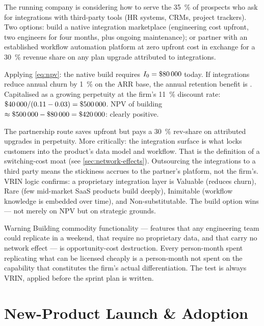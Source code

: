\begin{example}
The running company is considering how to serve the \qty{35}{\percent} of prospects who
ask for integrations with third-party tools (HR systems, CRMs, project trackers). Two
options: build a native integration marketplace (engineering cost  upfront,
two engineers for four months, plus ongoing maintenance); or partner with an established
workflow automation platform at zero upfront cost in exchange for a \qty{30}{\percent}
revenue share on any plan upgrade attributed to integrations.

Applying \cref{eq:npv}: the native build requires \(I_0 = \$\num{80000}\) today. If
integrations reduce annual churn by \qty{1}{\percent} on the  ARR base,
the annual retention benefit is . Capitalised as a growing perpetuity at the
firm's \qty{11}{\percent} discount rate: \(\$\num{40000}/(0.11 - 0.03) = \$\num{500000}\).
NPV of building \(\approx \$\num{500000} - \$\num{80000} = \$\num{420000}\): clearly positive.

The partnership route saves  upfront but pays a \qty{30}{\percent} rev-share
on attributed upgrades in perpetuity. More critically: the integration surface is what
locks customers into the product's data model and workflow. That is the definition of a
switching-cost moat (see \cref{sec:network-effects}). Outsourcing the integrations to a
third party means the stickiness accrues to the partner's platform, not the firm's.
VRIN logic confirms: a proprietary integration layer is Valuable (reduces churn),
Rare (few mid-market SaaS products build deeply), Inimitable (workflow knowledge is
embedded over time), and Non-substitutable. The build option wins --- not merely on NPV
but on strategic grounds.
\end{example}

\begin{admonition}{Warning}
Building commodity functionality --- features that any engineering team could replicate
in a weekend, that require no proprietary data, and that carry no network effect --- is
opportunity-cost destruction. Every person-month spent replicating what can be licensed
cheaply is a person-month not spent on the capability that constitutes the firm's
actual differentiation. The test is always VRIN, applied before the sprint plan is
written.
\end{admonition}

\section{New-Product Launch \& Adoption}\label{sec:adoption-curves}

